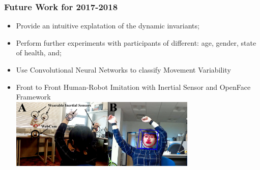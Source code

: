 \documentclass{beamer}
\begin{document}
\begin{frame}
\frametitle{Future Work for 2017-2018}
\vspace{-10mm}
\begin{itemize}
    \item Provide an intuitive explatation of the dynamic invariants;
    \item Perform further experiments with participants of different:
    age, gender, state of health, and;
    \item Use Convolutional Neural Networks to classify Movement Variability
    \item Front to Front Human-Robot Imitation with Inertial Sensor and
    OpenFace Framework \\
    \includegraphics[width=0.7\textwidth]{fig_w619h233}
\end{itemize}



\end{frame}


%
\end{document}
